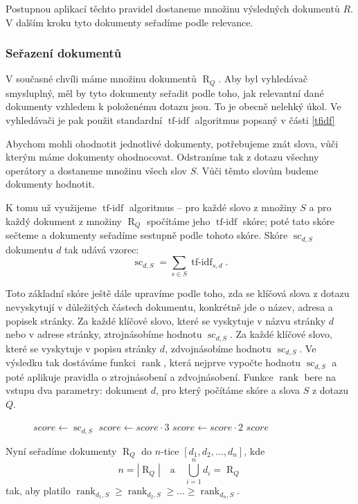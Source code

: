\documentclass[12pt]{article}
\newcommand{\sssection}[1]{\subsubsection{#1}}
\newcommand{\addh}[1]{\left[#1\right]}
\DeclareMathOperator{\tfidf}{tf-idf}
\DeclareMathOperator{\score}{sc}
\DeclareMathOperator{\getdocs}{R}
\DeclareMathOperator{\rank}{rank}
\begin{document}
Postupnou aplikací těchto pravidel dostaneme množinu výsledných dokumentů $R$. V dalším kroku tyto dokumenty seřadíme podle relevance. 

\sssection{Seřazení dokumentů}

V současné chvíli máme množinu dokumentů $\getdocs_Q$. Aby byl vyhledávač smysluplný, měl by tyto dokumenty seřadit podle toho, jak relevantní dané dokumenty vzhledem k položenému dotazu jsou. To je obecně nelehký úkol. Ve vyhledávači je pak použit standardní $\tfidf$ algoritmus popsaný v části \ref{tfidf}

Abychom mohli ohodnotit jednotlivé dokumenty, potřebujeme znát slova, vůči kterým máme dokumenty ohodnocovat. Odstraníme tak z dotazu všechny operátory a dostaneme množinu všech slov $S$. Vůči těmto slovům budeme dokumenty hodnotit. 

K tomu už využijeme $\tfidf$ algoritmus -- pro každé slovo z množiny $S$ a pro každý dokument z množiny $\getdocs_Q$ spočítáme jeho $\tfidf$ skóre; poté tato skóre sečteme a dokumenty seřadíme sestupně podle tohoto skóre. Skóre $\score_{d,S}$ dokumentu $d$ tak udává vzorec:
$$\score_{d,S}=\sum_{s\in S} \tfidf_{s, d}.$$

Toto základní skóre ještě dále upravíme podle toho, zda se klíčová slova z dotazu nevyskytují v důležitých částech dokumentu, konkrétně jde o název, adresa a popisek stránky. Za každé klíčové slovo, které se vyskytuje v názvu stránky $d$ nebo v adrese stránky, ztrojnásobíme hodnotu $\score_{d,S}$. Za každé klíčové slovo, které se vyskytuje v popisu stránky $d$, zdvojnásobíme hodnotu $\score_{d,S}$. Ve výsledku tak dostáváme funkci $\rank$, která nejprve vypočte hodnotu $\score_{d,S}$ a poté aplikuje pravidla o ztrojnásobení a zdvojnásobení. Funkce $\rank$ bere na vstupu dva parametry: dokument $d$, pro který počítáme skóre a slova $S$ z dotazu $Q$.

\begin{figure}
\begin{algorithmic}
    \State $score \gets \score_{d, S}$
    		\State $score \gets score \cdot 3$
    	\EndIf
    		\State $score \gets score \cdot 2$
    	\EndIf
    \EndFor
    \State \Return $score$
\EndFunction
\end{algorithmic}
\end{figure}



Nyní seřadíme dokumenty $\getdocs_Q$ do $n$-tice $\addh{d_1, d_2, \ldots, d_n}$, kde 
$$n=\left|\getdocs_Q\right|\quad\mbox{a}\quad \bigcup_{i=1}^n d_i=\getdocs_Q$$ 
tak, aby platilo $\rank_{d_1, S} \ge \rank_{d_2, S} \ge \ldots \ge \rank_{d_n, S}$.
\end{document}
